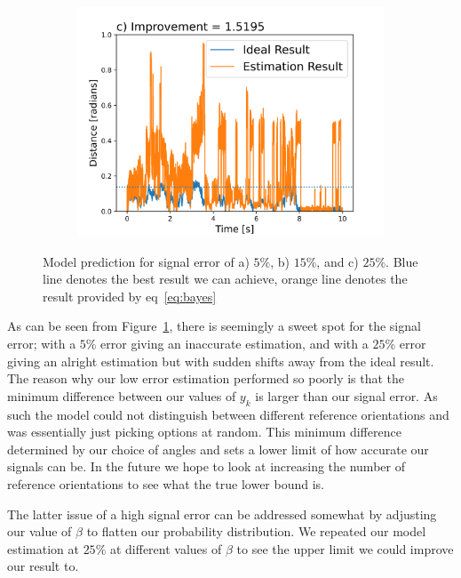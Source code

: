 \documentclass[final, 3p]{elsarticle}
\begin{document}
\begin{figure}[h]
\begin{subfigure}{0.5\textwidth}
		\includegraphics[width=\textwidth]{./Images/epsilon_25.png}
	\end{subfigure}
	\caption{Model prediction for signal error of a) $5\%$, b) $15\%$, and c) $25\%$. Blue line denotes the best result we can achieve, orange line denotes the result provided by eq~\ref{eq:bayes}}
	\label{fig:epsilon}
\end{figure}

As can be seen from Figure~\ref{fig:epsilon}, there is seemingly a
sweet spot for the signal error; with a $5$\% error giving an
inaccurate estimation, and with a $25$\% error giving an alright
estimation but with sudden shifts away from the ideal result. The
reason why our low error estimation performed so poorly is that the
minimum difference between our values of $y_k$ is larger than our
signal error.  As such the model could not distinguish between
different reference orientations and was essentially just picking
options at random.  This minimum difference determined by our choice of
angles and sets a lower limit of how accurate our signals can be.  In
the future we hope to look at increasing the number of reference
orientations to see what the true lower bound is.

The latter issue of a high signal error can be addressed somewhat by
adjusting our value of $\beta$ to flatten our probability
distribution. We repeated our model estimation at $25\%$ at different
values of $\beta$ to see the upper limit we could improve our result
to.
\end{document}
